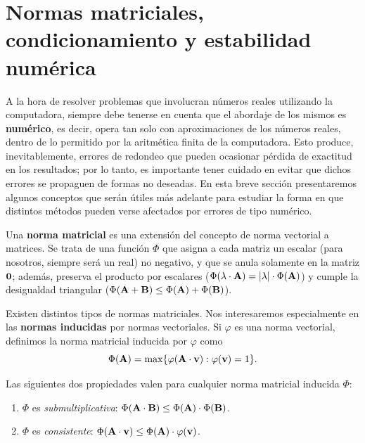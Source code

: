 
\section{Normas matriciales, condicionamiento y estabilidad numérica}
\label{section:estabilidad}

A la hora de resolver problemas que involucran números reales utilizando la
computadora, siempre debe tenerse en cuenta que el abordaje de los mismos es
\textbf{numérico}, es decir, opera tan solo con aproximaciones de los números
reales, dentro de lo permitido por la aritmética finita de la computadora.
Esto produce, inevitablemente, errores de redondeo que pueden ocasionar pérdida
de exactitud en los resultados; por lo tanto, es importante tener cuidado en
evitar que dichos errores se propaguen de formas no deseadas.
En esta breve sección presentaremos algunos conceptos que serán útiles más
adelante para estudiar la forma en que distintos métodos pueden verse
afectados por errores de tipo numérico.

Una \textbf{norma matricial} es una extensión del concepto de norma vectorial
a matrices. Se trata de una función $\Phi$ que asigna a cada matriz un escalar
(para nosotros, siempre será un real) no negativo, y que se anula solamente en
la matriz $\mathbf{0}$; además, preserva el producto por escalares ($\Phi(
\lambda \cdot \mathbf{A}) = \lvert \lambda \rvert \cdot \Phi(\mathbf{A})$) y cumple
la desigualdad triangular ($\Phi(\mathbf{A} + \mathbf{B}) \leq \Phi(\mathbf{A}) +
\Phi(\mathbf{B})$).

Existen distintos tipos de normas matriciales. Nos interesaremos especialmente
en las \textbf{normas inducidas} por normas vectoriales. Si $\varphi$ es una
norma vectorial, definimos la norma matricial inducida por $\varphi$ como
\[ \Phi(\mathbf{A}) =
    \max \{ \varphi(\mathbf{A} \cdot \mathbf{v}) : \varphi(\mathbf{v}) = 1 \}. \]

Las siguientes dos propiedades valen para cualquier norma matricial inducida
$\Phi$:
\begin{enumerate}[label=(\roman*)]
\item $\Phi$ es \emph{submultiplicativa}: $\Phi(\mathbf{A} \cdot \mathbf{B}) \leq
    \Phi({\mathbf{A}}) \cdot \Phi(\mathbf{B})$.
\item $\Phi$ es \emph{consistente}: $\Phi(\mathbf{A} \cdot \mathbf{v}) \leq
    \Phi(\mathbf{A}) \cdot \varphi(\mathbf{v})$.
\end{enumerate}

